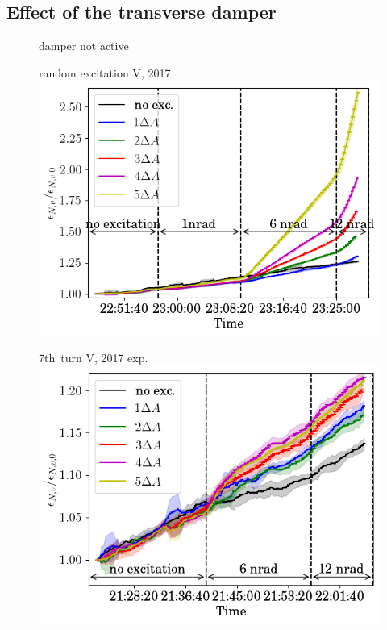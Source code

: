 \documentclass[%
 reprint,
 amsmath,amssymb,
 aps,
prstab,
longbibliography
]{revtex4-1}
\begin{document}
\subsection{Effect of the transverse damper}
\label{sec:damp}

\begin{figure}
	\centering
	damper not active\\
	\begin{minipage}[t]{0.32\linewidth}
		\centering
	random excitation V, 2017\\
		\includegraphics[height=0.75\linewidth]{2017_emitv_avg_rel_vran_no_damper.png}
	\end{minipage}	
	\begin{minipage}[t]{0.32\linewidth}
		\centering
		7th~turn V, 2017 exp.\\
		\includegraphics[height=0.75\linewidth]{2017_emitv_avg_rel_v7th_no_damper_no_text.png}

\end{minipage}
\end{figure}
\end{document}
